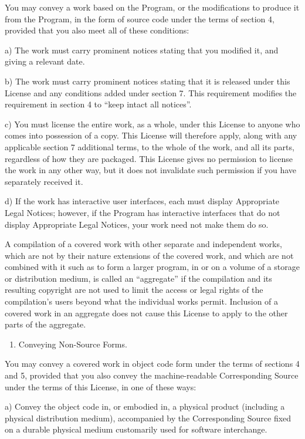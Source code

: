 \documentclass[letterpaper,10pt,english]{sphinxmanual}
\begin{document}
You may convey a work based on the Program, or the modifications to
produce it from the Program, in the form of source code under the
terms of section 4, provided that you also meet all of these conditions:

a) The work must carry prominent notices stating that you modified
it, and giving a relevant date.

b) The work must carry prominent notices stating that it is
released under this License and any conditions added under section
7.  This requirement modifies the requirement in section 4 to
“keep intact all notices”.

c) You must license the entire work, as a whole, under this
License to anyone who comes into possession of a copy.  This
License will therefore apply, along with any applicable section 7
additional terms, to the whole of the work, and all its parts,
regardless of how they are packaged.  This License gives no
permission to license the work in any other way, but it does not
invalidate such permission if you have separately received it.

d) If the work has interactive user interfaces, each must display
Appropriate Legal Notices; however, if the Program has interactive
interfaces that do not display Appropriate Legal Notices, your
work need not make them do so.

A compilation of a covered work with other separate and independent
works, which are not by their nature extensions of the covered work,
and which are not combined with it such as to form a larger program,
in or on a volume of a storage or distribution medium, is called an
“aggregate” if the compilation and its resulting copyright are not
used to limit the access or legal rights of the compilation’s users
beyond what the individual works permit.  Inclusion of a covered work
in an aggregate does not cause this License to apply to the other
parts of the aggregate.
\begin{enumerate}
%
\setcounter{enumi}{5}
\item {} 
Conveying Non-Source Forms.

\end{enumerate}

You may convey a covered work in object code form under the terms
of sections 4 and 5, provided that you also convey the
machine-readable Corresponding Source under the terms of this License,
in one of these ways:

a) Convey the object code in, or embodied in, a physical product
(including a physical distribution medium), accompanied by the
Corresponding Source fixed on a durable physical medium
customarily used for software interchange.
\end{document}
